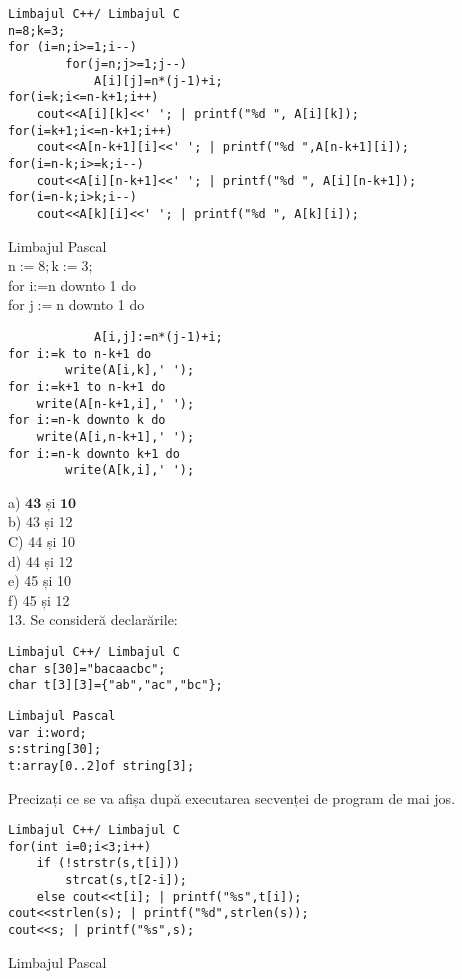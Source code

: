 \begin{verbatim}
Limbajul C++/ Limbajul C
n=8;k=3;
for (i=n;i>=1;i--)
        for(j=n;j>=1;j--)
            A[i][j]=n*(j-1)+i;
for(i=k;i<=n-k+1;i++)
    cout<<A[i][k]<<' '; | printf("%d ", A[i][k]);
for(i=k+1;i<=n-k+1;i++)
    cout<<A[n-k+1][i]<<' '; | printf("%d ",A[n-k+1][i]);
for(i=n-k;i>=k;i--)
    cout<<A[i][n-k+1]<<' '; | printf("%d ", A[i][n-k+1]);
for(i=n-k;i>k;i--)
    cout<<A[k][i]<<' '; | printf("%d ", A[k][i]);
\end{verbatim}

Limbajul Pascal\\
$\mathrm{n}:=8 ; \mathrm{k}:=3$;\\
for i:=n downto 1 do\\
for $\mathrm{j}:=\mathrm{n}$ downto 1 do

\begin{verbatim}
            A[i,j]:=n*(j-1)+i;
for i:=k to n-k+1 do
        write(A[i,k],' ');
for i:=k+1 to n-k+1 do
    write(A[n-k+1,i],' ');
for i:=n-k downto k do
    write(A[i,n-k+1],' ');
for i:=n-k downto k+1 do
        write(A[k,i],' ');
\end{verbatim}

a) $\mathbf{4 3}$ și $\mathbf{1 0}$\\
b) 43 și 12\\
C) 44 și 10\\
d) 44 și 12\\
e) 45 și 10\\
f) 45 și 12\\
13. Se consideră declarările:

\begin{verbatim}
Limbajul C++/ Limbajul C
char s[30]="bacaacbc";
char t[3][3]={"ab","ac","bc"};
\end{verbatim}

\begin{verbatim}
Limbajul Pascal
var i:word;
s:string[30];
t:array[0..2]of string[3];
\end{verbatim}

Precizați ce se va afișa după executarea secvenței de program de mai jos.

\begin{verbatim}
Limbajul C++/ Limbajul C
for(int i=0;i<3;i++)
    if (!strstr(s,t[i]))
        strcat(s,t[2-i]);
    else cout<<t[i]; | printf("%s",t[i]);
cout<<strlen(s); | printf("%d",strlen(s));
cout<<s; | printf("%s",s);
\end{verbatim}

Limbajul Pascal

